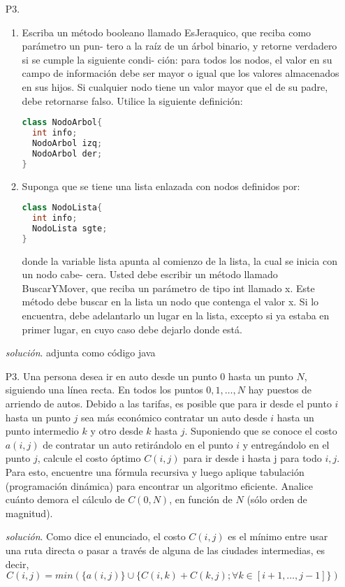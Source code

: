 \documentclass[dcc]{fcfmcourse}
\begin{document}
\begin{itemize}
\item[P3.] 
\begin{enumerate}
\item Escriba un método booleano llamado EsJeraquico, que reciba como parámetro un pun-
tero a la raíz de un árbol binario, y retorne verdadero si se cumple la siguiente condi-
ción: para todos los nodos, el valor en su campo de información debe ser mayor o igual
que los valores almacenados en sus hijos. Si cualquier nodo tiene un valor mayor que
el de su padre, debe retornarse falso. Utilice la siguiente definición:

\begin{lstlisting}[language=Java, frame=single]
class NodoArbol{
  int info;
  NodoArbol izq;
  NodoArbol der;
}
\end{lstlisting}

\item Suponga que se tiene una lista enlazada con nodos definidos por:

\begin{lstlisting}[language=Java, frame=single]
class NodoLista{
  int info;
  NodoLista sgte;
}
\end{lstlisting}

donde la variable lista apunta al comienzo de la lista, la cual se inicia con un nodo cabe-
cera. Usted debe escribir un método llamado BuscarYMover, que reciba un parámetro
de tipo int llamado x. Este método debe buscar en la lista un nodo que contenga el valor
x. Si lo encuentra, debe adelantarlo un lugar en la lista, excepto si ya estaba en primer
lugar, en cuyo caso debe dejarlo donde está. 
\end{enumerate}

\item[\textit{solución}.] adjunta como código java

\item[P3.] 
Una persona desea ir en auto desde un punto $0$ hasta un punto $N$, siguiendo una línea recta. En todos los puntos $0, 1, \ldots , N$ hay puestos de arriendo de autos. Debido a las tarifas, es posible que para ir desde el punto $i$ hasta un punto $j$ sea más económico contratar un auto desde $i$ hasta un punto intermedio $k$ y otro desde $k$ hasta $j$. Suponiendo que se conoce el costo $a(i, j)$ de contratar un auto retirándolo en el punto $i$ y entregándolo en el punto $j$, calcule el costo óptimo $C(i, j)$ para ir desde i hasta j para todo $i, j$. Para esto, encuentre una fórmula recursiva y luego aplique tabulación (programación dinámica) para encontrar un algoritmo eficiente. Analice cuánto demora el cálculo de $C(0, N)$, en función de $N$ (sólo orden de magnitud).
\item[\textit{solución}.] Como dice el enunciado, el costo $C(i,j)$ es el mínimo entre usar una ruta directa o pasar a través de alguna de las ciudades intermedias, es decir,
\begin{equation*}
C(i,j) = min\left(\lbrace a(i,j) \rbrace \cup \lbrace C(i,k) + C(k,j); \forall k \in [i+1,\ldots,j-1] \rbrace \right)
\end{equation*}


\end{itemize}
\end{document}
